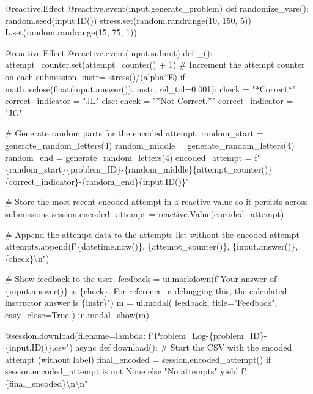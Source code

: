 \documentclass[
  letterpaper,
  DIV=11,
  numbers=noendperiod]{scrreprt}
\newenvironment{Shaded}{\begin{snugshade}}{\end{snugshade}}
\newcommand{\NormalTok}[1]{\textcolor[rgb]{0.00,0.23,0.31}{#1}}
\begin{document}
\begin{Shaded}
\begin{Highlighting}[]
\NormalTok{    @reactive.Effect}
\NormalTok{    @reactive.event(input.generate\_problem)}
\NormalTok{    def randomize\_vars():}
\NormalTok{        random.seed(input.ID())}
\NormalTok{        stress.set(random.randrange(10, 150, 5))}
\NormalTok{        L.set(random.randrange(15, 75, 1))}
        
\NormalTok{    @reactive.Effect}
\NormalTok{    @reactive.event(input.submit)}
\NormalTok{    def \_():}
\NormalTok{        attempt\_counter.set(attempt\_counter() + 1)  \# Increment the attempt counter on each submission.}
\NormalTok{        instr= stress()/(alpha*E)}
\NormalTok{        if math.isclose(float(input.answer()), instr, rel\_tol=0.001):}
\NormalTok{            check = "*Correct*"}
\NormalTok{            correct\_indicator = "JL"}
\NormalTok{        else:}
\NormalTok{            check = "*Not Correct.*"}
\NormalTok{            correct\_indicator = "JG"}

\NormalTok{        \# Generate random parts for the encoded attempt.}
\NormalTok{        random\_start = generate\_random\_letters(4)}
\NormalTok{        random\_middle = generate\_random\_letters(4)}
\NormalTok{        random\_end = generate\_random\_letters(4)}
\NormalTok{        encoded\_attempt = f"\{random\_start\}\{problem\_ID\}{-}\{random\_middle\}\{attempt\_counter()\}\{correct\_indicator\}{-}\{random\_end\}\{input.ID()\}"}

\NormalTok{        \# Store the most recent encoded attempt in a reactive value so it persists across submissions}
\NormalTok{        session.encoded\_attempt = reactive.Value(encoded\_attempt)}

\NormalTok{        \# Append the attempt data to the attempts list without the encoded attempt}
\NormalTok{        attempts.append(f"\{datetime.now()\}, \{attempt\_counter()\}, \{input.answer()\}, \{check\}\textbackslash{}n")}

\NormalTok{        \# Show feedback to the user.}
\NormalTok{        feedback = ui.markdown(f"Your answer of \{input.answer()\} is \{check\}. For reference in debugging this, the calculated instructor answer is \{instr\}")}
\NormalTok{        m = ui.modal(}
\NormalTok{            feedback,}
\NormalTok{            title="Feedback",}
\NormalTok{            easy\_close=True}
\NormalTok{        )}
\NormalTok{        ui.modal\_show(m)}

\NormalTok{    @session.download(filename=lambda: f"Problem\_Log{-}\{problem\_ID\}{-}\{input.ID()\}.csv")}
\NormalTok{    async def download():}
\NormalTok{        \# Start the CSV with the encoded attempt (without label)}
\NormalTok{        final\_encoded = session.encoded\_attempt() if session.encoded\_attempt is not None else "No attempts"}
\NormalTok{        yield f"\{final\_encoded\}\textbackslash{}n\textbackslash{}n"}
        

\end{Highlighting}
\end{Shaded}
\end{document}
